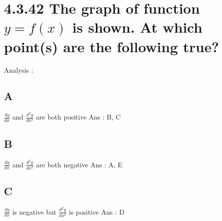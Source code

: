 \section*{4.3.42
    \textbf{
        The graph of function $y = f(x)$ is shown. At which point(s) are the following true?
    }
}

\par
Analysis :

\subsection*{A}
    $ \frac{dy}{dx} $ and $\frac{d^2y}{dx^2}$ are both positive
    Ans : B, C
\subsection*{B}
    $ \frac{dy}{dx} $ and $\frac{d^2y}{dx^2}$ are both negative
    Ans : A, E
\subsection*{C}
    $ \frac{dy}{dx} $ is negative but $\frac{d^2y}{dx^2}$ is positive
    Ans : D
